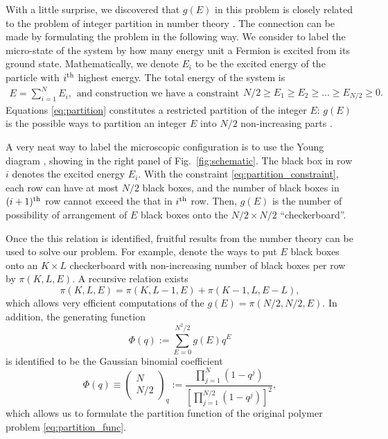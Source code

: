 \documentclass[aps,showpacs,twocolumn,floatfix,prx,superscriptaddress]{revtex4-1}
\begin{document}
With a little surprise, we discovered that $g(E)$ in this problem is closely
related to the problem of integer partition in number theory
\cite{}. The connection can be made by formulating the problem
in the following way. We consider to label the micro-state of the system by how
many energy unit a Fermion is excited from its ground state. Mathematically, we
denote $E_i$ to be the excited energy of the particle with $i^{\rm th}$ highest
energy. The total energy of the system is
\begin{subequations} 
    \label{eq:partition}
    \begin{align}
        E= \sum_{i=1}^{N} E_i,
    \end{align}
\text{and construction we have a constraint}
    \begin{align}
        \label{eq:partition_constraint}
        N/2 \ge E_1 \ge E_2 \ge \ldots \ge E_{N/2} \ge 0. 
    \end{align}
\end{subequations}
Equations \eqref{eq:partition} constitutes a restricted partition of the integer
$E$: $g(E)$ is the possible ways to partition an integer $E$ into $N/2$
non-increasing parts \cite{}.

A very neat way to label the microscopic configuration is to use the Young
diagram \cite{}, showing in the right panel of Fig.~\ref{fig:schematic}. The
black box in row $i$ denotes the excited energy $E_i$. With the constraint
\eqref{eq:partition_constraint}, each row can have at most $N/2$ black boxes,
and the number of black boxes in $(i+1)^{\rm th}$ row cannot exceed the that in
$i^{\rm th}$ row.  Then, $g(E)$ is the number of possibility of arrangement of
$E$ black boxes onto the $N/2 \times N/2$ ``checkerboard''.

Once the this relation is identified, fruitful results from the number theory
\cite{} can be used to solve our problem. For example, denote  the ways to put
$E$ black boxes onto an $K \times L$ checkerboard with non-increasing number of
black boxes per row by $\pi \left(K,L,E\right)$. A recursive relation exists
\cite{}
\begin{equation}
    \pi\left(K,L,E\right) = \pi\left(K,L-1,E\right) + \pi \left(K-1,L, E-L\right),
\end{equation}
which allows very efficient computations of the
$g(E)=\pi\left(N/2,N/2,E\right)$. In addition, the generating function 
\begin{equation}
    \Phi \left(q\right) := \sum_{E=0}^{N^2/2} g(E) q^E
\end{equation}
is identified to be the Gaussian binomial coefficient
\begin{equation}
    \Phi \left(q\right) \equiv \left(\begin{array}{c} N \\ N/2
        \end{array}\right)_q := \frac{\prod_{j=1}^{N}
        \left(1-q^j\right)}{\left[\prod_{j=1}^{N/2} \left(1-q^j\right)\right]^2},
\end{equation}
which allows us to formulate the partition function of the original polymer
problem \eqref{eq:partition_func}. 
\end{document}
